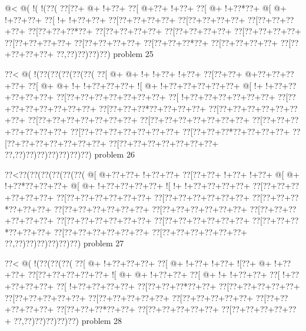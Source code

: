 \vbox{\vbox{\goo
\- @<\- @(\- !(\- !(\0??(
\0??[\0??+\- @+\- !+\0??+
\0??[\- @+\0??+\- !+\0??+
\0??[\- @+\- !+\0??*\0??+
\- @[\- @+\- !+\0??+\0??+
\0??[\- !+\- !+\0??+\0??+
\0??[\0??+\0??+\0??+\0??+
\0??[\0??+\0??+\0??+\0??+
\0??[\0??+\0??+\0??+\0??+
\0??[\0??+\0??+\0??*\0??+
\0??[\0??+\0??+\0??+\0??+
\0??[\0??+\0??+\0??+\0??+
\0??[\0??+\0??+\0??+\0??+
\0??[\0??+\0??+\0??+\0??+
\0??[\0??+\0??+\0??+\0??+
\0??[\0??+\0??+\0??*\0??+
\0??[\0??+\0??+\0??+\0??+
\0??[\0??+\0??+\0??+\0??+
\0??,\0??)\0??)\0??)\0??)
}
\hfil problem 25\hfil\break
}

\vbox{\vbox{\goo
\0??<\- @(\- !(\0??(\0??(\0??(\0??(\0??(
\0??[\- @+\- @+\- !+\- !+\0??+\- !+\0??+
\0??[\0??+\0??+\- @+\0??+\0??+\0??+\0??+
\0??[\- @+\- @+\- !+\- !+\0??+\0??+\0??+
\- ![\- @+\- !+\0??+\0??+\0??+\0??+\0??+
\- @[\- !+\- !+\0??+\0??+\0??+\0??+\0??+
\0??[\0??+\0??+\0??+\0??+\0??+\0??+\0??+
\0??[\- !+\0??+\0??+\0??+\0??+\0??+\0??+
\0??[\0??+\0??+\0??+\0??+\0??+\0??+\0??+
\0??[\0??+\0??+\0??*\0??+\0??+\0??+\0??+
\0??[\0??+\0??+\0??+\0??+\0??+\0??+\0??+
\0??[\0??+\0??+\0??+\0??+\0??+\0??+\0??+
\0??[\0??+\0??+\0??+\0??+\0??+\0??+\0??+
\0??[\0??+\0??+\0??+\0??+\0??+\0??+\0??+
\0??[\0??+\0??+\0??+\0??+\0??+\0??+\0??+
\0??[\0??+\0??+\0??*\0??+\0??+\0??+\0??+
\0??[\0??+\0??+\0??+\0??+\0??+\0??+\0??+
\0??[\0??+\0??+\0??+\0??+\0??+\0??+\0??+
\0??,\0??)\0??)\0??)\0??)\0??)\0??)\0??)
}
\hfil problem 26\hfil\break
}

\vbox{\vbox{\goo
\0??<\0??(\0??(\0??(\0??(\0??(\0??(
\- @[\- @+\0??+\0??+\- !+\0??+\0??+
\0??[\0??+\0??+\- !+\0??+\- !+\0??+
\- @[\- @+\- !+\0??*\0??+\0??+\0??+
\- @[\- @+\- !+\0??+\0??+\0??+\0??+
\- ![\- !+\- !+\0??+\0??+\0??+\0??+
\0??[\0??+\0??+\0??+\0??+\0??+\0??+
\0??[\0??+\0??+\0??+\0??+\0??+\0??+
\0??[\0??+\0??+\0??+\0??+\0??+\0??+
\0??[\0??+\0??+\0??*\0??+\0??+\0??+
\0??[\0??+\0??+\0??+\0??+\0??+\0??+
\0??[\0??+\0??+\0??+\0??+\0??+\0??+
\0??[\0??+\0??+\0??+\0??+\0??+\0??+
\0??[\0??+\0??+\0??+\0??+\0??+\0??+
\0??[\0??+\0??+\0??+\0??+\0??+\0??+
\0??[\0??+\0??+\0??*\0??+\0??+\0??+
\0??[\0??+\0??+\0??+\0??+\0??+\0??+
\0??[\0??+\0??+\0??+\0??+\0??+\0??+
\0??,\0??)\0??)\0??)\0??)\0??)\0??)
}
\hfil problem 27\hfil\break
}

\vbox{\vbox{\goo
\0??<\- @(\- !(\0??(\0??(\0??(
\0??[\- @+\- !+\0??+\0??+\0??+
\0??[\- @+\- !+\0??+\- !+\0??+
\- ![\0??+\- @+\- !+\0??+\0??+
\0??[\0??+\0??+\0??+\0??+\0??+
\- ![\- @+\- @+\- !+\0??+\0??+
\0??[\- @+\- !+\- !+\0??+\0??+
\0??[\- !+\0??+\0??+\0??+\0??+
\0??[\- !+\0??+\0??+\0??+\0??+
\0??[\0??+\0??+\0??*\0??+\0??+
\0??[\0??+\0??+\0??+\0??+\0??+
\0??[\0??+\0??+\0??+\0??+\0??+
\0??[\0??+\0??+\0??+\0??+\0??+
\0??[\0??+\0??+\0??+\0??+\0??+
\0??[\0??+\0??+\0??+\0??+\0??+
\0??[\0??+\0??+\0??*\0??+\0??+
\0??[\0??+\0??+\0??+\0??+\0??+
\0??[\0??+\0??+\0??+\0??+\0??+
\0??,\0??)\0??)\0??)\0??)\0??)
}
\hfil problem 28\hfil\break
}

